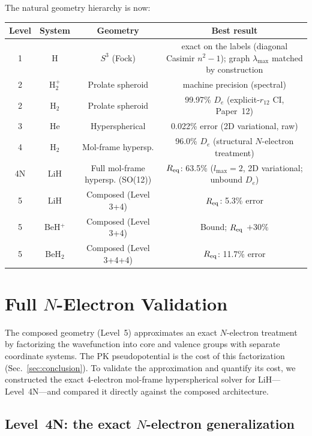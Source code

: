 \documentclass[aps,pra,twocolumn,superscriptaddress,longbibliography,floatfix]{revtex4-2}
\begin{document}
The natural geometry hierarchy is now:
\begin{center}
\begin{tabular}{cccc}
\toprule
Level & System & Geometry & Best result \\
\midrule
1 & H       & $S^3$ (Fock)           & exact on the labels (diagonal Casimir $n^2-1$); graph $\lambda_{\max}$ matched by construction \\
2 & H$_2^+$ & Prolate spheroid       & machine precision (spectral) \\
2 & H$_2$   & Prolate spheroid       & 99.97\% $D_e$ (explicit-$r_{12}$ CI, Paper~12) \\
3 & He      & Hyperspherical         & 0.022\% error (2D variational, raw) \\
4 & H$_2$   & Mol-frame hypersp.     & 96.0\% $D_e$ (structural $N$-electron treatment) \\
4N & LiH    & Full mol-frame hypersp. (SO(12)) & $R_{\rm eq}$: 63.5\% ($l_{\max}=2$, 2D variational; unbound $D_e$) \\
5 & LiH     & Composed (Level 3+4)   & $R_{\rm eq}$: 5.3\% error \\
5 & BeH$^+$ & Composed (Level 3+4)   & Bound; $R_{\rm eq}$ $+30\%$ \\
5 & BeH$_2$ & Composed (Level 3+4+4) & $R_{\rm eq}$: 11.7\% error \\
\bottomrule
\end{tabular}
\end{center}


\section{Full $N$-Electron Validation}
\label{sec:n_electron}

The composed geometry (Level~5) approximates an exact $N$-electron
treatment by factorizing the wavefunction into core and valence groups
with separate coordinate systems.  The PK pseudopotential is the cost
of this factorization (Sec.~\ref{sec:conclusion}).  To validate the
approximation and quantify its cost, we constructed the exact
4-electron mol-frame hyperspherical solver for LiH---Level~4N---and
compared it directly against the composed architecture.

\subsection{Level~4N: the exact $N$-electron generalization}
\end{document}
